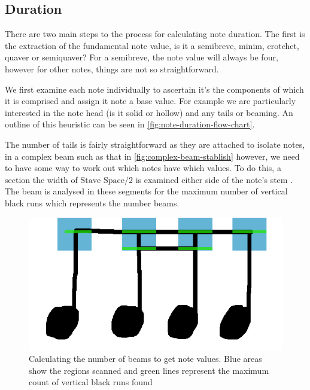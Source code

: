 \subsection{Duration}
\label{sec:duration-identification}

There are two main steps to the process for calculating note duration. The first is the extraction of the fundamental note value, is it a semibreve, minim, crotchet, quaver or semiquaver? For a  semibreve, the note value will always be four, however for other notes, things are not so straightforward.

We first examine each note individually to ascertain it's the components of which it is comprised and assign it note a base value. For example we are particularly interested in the note head (is it solid or hollow) and any tails or beaming. An outline of this heuristic can be seen in \cref{fig:note-duration-flow-chart}.

The number of tails is fairly straightforward as they are attached to isolate notes, in a complex beam such as that in \cref{fig:complex-beam-stablish} however, we need to have some way to work out which notes have which values. To do this, a section the width of $\text{Stave Space} / 2$ is examined either side of the note's stem . The beam is analysed in these segments for the maximum number of vertical black runs which represents the number beams.

\begin{figure}[H]
  \includegraphics[width=\linewidth]{gfx/implementation/beam-identification.png}
  \caption{Calculating the number of beams to get note values. Blue areas show the regions scanned and green lines represent the maximum count of vertical black runs found}
  \label{fig:complex-beam-establish}
\end{figure}

